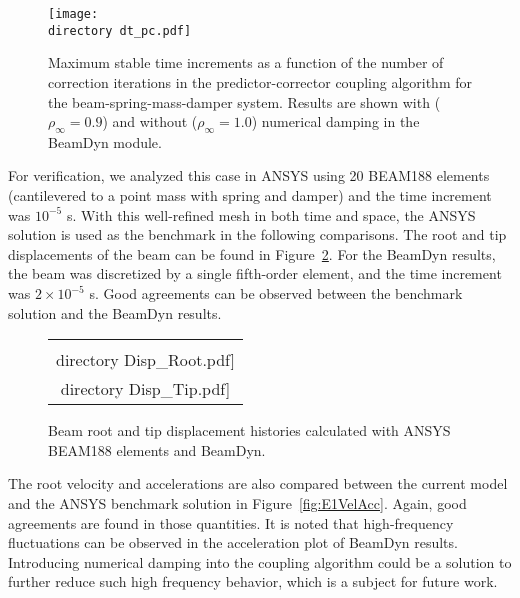 \documentclass{aiaa-tc}
\def\directory{EPSF/}
\begin{document}
 \begin{figure}
\centering
\texttt{[image: \\directory dt\_pc.pdf]}
\caption{Maximum stable time increments as a function of the number of correction iterations in the predictor-corrector coupling algorithm for the beam-spring-mass-damper system. Results are shown with ($\rho_\infty = 0.9$) and without ($\rho_\infty = 1.0$) numerical damping in the BeamDyn module.
} 
\label{fig:CoupledDTPC}
\end{figure}
 
For verification, we analyzed this case in ANSYS using 20 BEAM188 elements (cantilevered to a point mass with spring and damper) and the time increment was $10^{-5}$ s. 
With this well-refined mesh in both time and space, the ANSYS solution is used as the benchmark in the following comparisons. 
The root and tip displacements of the beam can be found in Figure~\ref{fig:E1Disp}. 
For the BeamDyn results, the beam was discretized by a single fifth-order element, and the time increment was  $2\times10^{-5}$ s. 
Good agreements can be observed between the benchmark solution and the BeamDyn results. 

\begin{figure}
    \centering
    \begin{tabular}{c}
    \subfloat[Root Displacement]{\label{fig:E1DispRoot}\texttt{[image: \\directory  Disp\_Root.pdf]}} \qquad
\subfloat[Tip Displacement]{\label{fig:E1DispTip}\texttt{[image: \\directory  Disp\_Tip.pdf]}}\\
\end{tabular}
\caption{Beam root and tip displacement histories calculated with ANSYS BEAM188 elements and BeamDyn.}
\label{fig:E1Disp}
\end{figure} 

The root velocity and accelerations are also compared between the current model and the ANSYS benchmark solution in Figure~\ref{fig:E1VelAcc}. 
Again, good agreements are found in those quantities. 
It is noted that high-frequency fluctuations can be observed in the acceleration plot of BeamDyn results. 
Introducing numerical damping into the coupling algorithm could be a solution to further reduce such high frequency behavior, which is a subject for future work.
\end{document}
